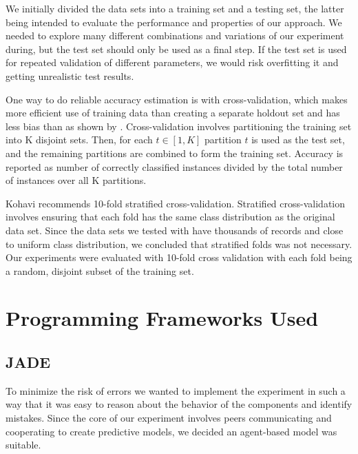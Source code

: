 We initially divided the data sets into a training set and a testing set, the latter being intended to evaluate the performance and properties of our approach. We needed to explore many different combinations and variations of our experiment during, but the test set should only be used as a final step. If the test set is used for repeated validation of different parameters, we would risk overfitting it and getting unrealistic test results. 

One way to do reliable accuracy estimation is with cross-validation, which makes more efficient use of training data than creating a separate holdout set and has less bias than as shown by \cite{kohavi1995crossvalidation}. Cross-validation involves partitioning the training set into K disjoint sets. Then, for each $t \in [1, K]$ partition $t$ is used as the test set, and the remaining partitions are combined to form the training set. Accuracy is reported as number of correctly classified instances divided by the total number of instances over all K partitions. 

Kohavi recommends 10-fold stratified cross-validation. Stratified cross-validation involves ensuring that each fold has the same class distribution as the original data set. Since the data sets we tested with have thousands of records and close to uniform class distribution, we concluded that stratified folds was not necessary. Our experiments were evaluated with 10-fold cross validation with each fold being a random, disjoint subset of the training set.


\section{Programming Frameworks Used}

 \subsection{JADE}
 
To minimize the risk of errors we wanted to implement the experiment in such a way that it was easy to reason about the behavior of the components and identify mistakes. Since the core of our experiment involves peers communicating and cooperating to create predictive models, we decided an agent-based model was suitable.  
 
